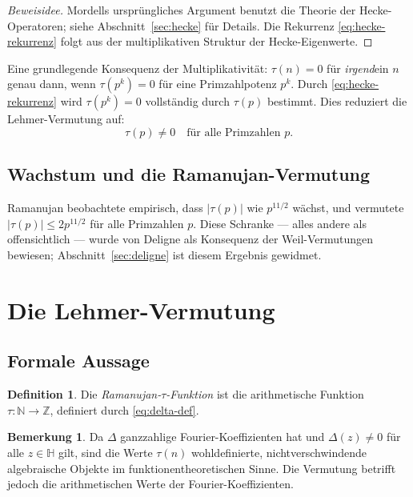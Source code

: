 \documentclass[12pt,a4paper]{amsart}
\theoremstyle{definition}
\newtheorem{definition}[theorem]{Definition}
\newtheorem{remark}[theorem]{Bemerkung}
\begin{document}
\begin{proof}[Beweisidee]
  Mordells ursprüngliches Argument benutzt die Theorie der Hecke-Operatoren; siehe
  Abschnitt~\ref{sec:hecke} für Details. Die Rekurrenz \eqref{eq:hecke-rekurrenz}
  folgt aus der multiplikativen Struktur der Hecke-Eigenwerte.
\end{proof}

Eine grundlegende Konsequenz der Multiplikativität: $\tau(n) = 0$ für \emph{irgend}ein
$n$ genau dann, wenn $\tau(p^k) = 0$ für eine Primzahlpotenz $p^k$. Durch
\eqref{eq:hecke-rekurrenz} wird $\tau(p^k) = 0$ vollständig durch $\tau(p)$
bestimmt. Dies reduziert die Lehmer-Vermutung auf:
\begin{equation}\label{eq:reduzierte-vermutung}
  \tau(p) \neq 0 \quad \text{für alle Primzahlen } p.
\end{equation}

\subsection{Wachstum und die Ramanujan-Vermutung}

Ramanujan beobachtete empirisch, dass $|\tau(p)|$ wie $p^{11/2}$ wächst, und
vermutete $|\tau(p)| \leq 2p^{11/2}$ für alle Primzahlen $p$. Diese Schranke ---
alles andere als offensichtlich --- wurde von Deligne als Konsequenz der
Weil-Vermutungen bewiesen; Abschnitt~\ref{sec:deligne} ist diesem Ergebnis
gewidmet.

\section{Die Lehmer-Vermutung}

\subsection{Formale Aussage}

\begin{definition}
  Die \emph{Ramanujan-$\tau$-Funktion} ist die arithmetische Funktion
  $\tau : \mathbb{N} \to \mathbb{Z}$, definiert durch \eqref{eq:delta-def}.
\end{definition}

\begin{remark}
  Da $\Delta$ ganzzahlige Fourier-Koeffizienten hat und $\Delta(z) \neq 0$ für alle
  $z \in \mathbb{H}$ gilt, sind die Werte $\tau(n)$ wohldefinierte, nichtverschwindende
  algebraische Objekte im funktionentheoretischen Sinne. Die Vermutung betrifft
  jedoch die arithmetischen Werte der Fourier-Koeffizienten.
\end{remark}
\end{document}
